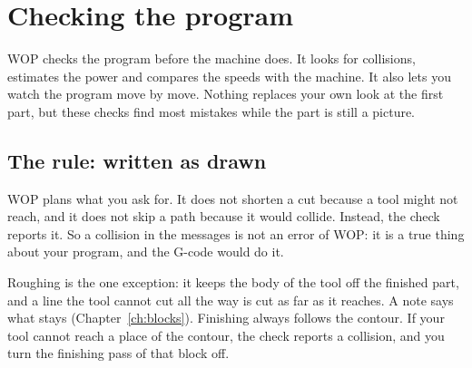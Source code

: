 \chapter{Checking the program}\label{ch:checking}

WOP checks the program before the machine does. It looks for collisions, estimates the power and compares the speeds with the machine. It also lets you watch the program move by move. Nothing replaces your own look at the first part, but these checks find most mistakes while the part is still a picture.

\section{The rule: written as drawn}
WOP plans what you ask for. It does not shorten a cut because a tool might not reach, and it does not skip a path because it would collide. Instead, the check reports it. So a collision in the messages is not an error of WOP: it is a true thing about your program, and the G-code would do it.

Roughing is the one exception: it keeps the body of the tool off the finished part, and a line the tool cannot cut all the way is cut as far as it reaches. A note says what stays (Chapter~\ref{ch:blocks}). Finishing always follows the contour. If your tool cannot reach a place of the contour, the check reports a collision, and you turn the finishing pass of that block off.

